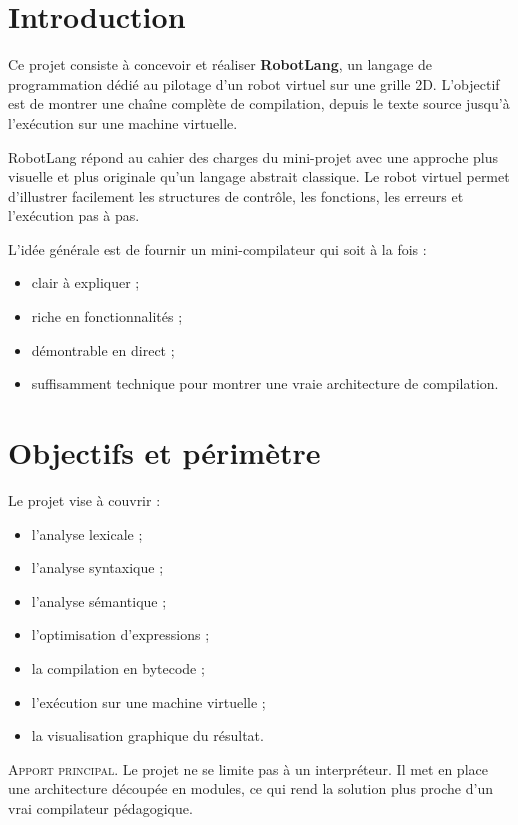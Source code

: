 \documentclass[12pt,a4paper]{article}
\newcommand{\smallcapslabel}[1]{\textcolor{accent}{\textsc{#1}}}
\begin{document}
\tableofcontents
\newpage

\section{Introduction}

\begin{futuristicbox}
Ce projet consiste à concevoir et réaliser \textbf{RobotLang}, un langage de programmation
dédié au pilotage d'un robot virtuel sur une grille 2D. L'objectif est de montrer une
chaîne complète de compilation, depuis le texte source jusqu'à l'exécution sur une machine
virtuelle.
\end{futuristicbox}

RobotLang répond au cahier des charges du mini-projet avec une approche plus visuelle et
plus originale qu'un langage abstrait classique. Le robot virtuel permet d'illustrer
facilement les structures de contrôle, les fonctions, les erreurs et l'exécution pas à pas.

L'idée générale est de fournir un mini-compilateur qui soit à la fois :
\begin{itemize}[nosep]
  \item clair à expliquer ;
  \item riche en fonctionnalités ;
  \item démontrable en direct ;
  \item suffisamment technique pour montrer une vraie architecture de compilation.
\end{itemize}

\section{Objectifs et périmètre}

Le projet vise à couvrir :
\begin{itemize}[nosep]
  \item l'analyse lexicale ;
  \item l'analyse syntaxique ;
  \item l'analyse sémantique ;
  \item l'optimisation d'expressions ;
  \item la compilation en bytecode ;
  \item l'exécution sur une machine virtuelle ;
  \item la visualisation graphique du résultat.
\end{itemize}

\begin{futuristicbox}
\smallcapslabel{Apport principal.} Le projet ne se limite pas à un interpréteur.
Il met en place une architecture découpée en modules, ce qui rend la solution plus proche
d'un vrai compilateur pédagogique.
\end{futuristicbox}
\end{document}

